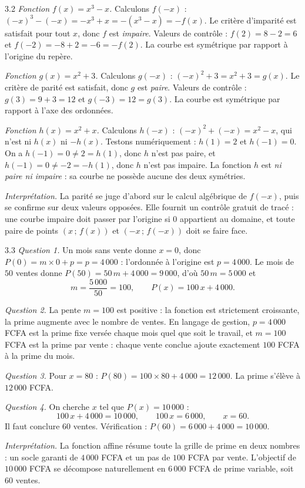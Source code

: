 \begin{corrige}{3.2}
\emph{Fonction $f(x) = x^{3} - x$.} Calculons $f(-x)$ : $(-x)^{3} - (-x) = -x^{3} + x = -(x^{3} - x) = -f(x)$. Le critère d'imparité est satisfait pour tout $x$, donc $f$ est \emph{impaire}. Valeurs de contrôle : $f(2) = 8 - 2 = 6$ et $f(-2) = -8 + 2 = -6 = -f(2)$. La courbe est symétrique par rapport à l'origine du repère.

\emph{Fonction $g(x) = x^{2} + 3$.} Calculons $g(-x)$ : $(-x)^{2} + 3 = x^{2} + 3 = g(x)$. Le critère de parité est satisfait, donc $g$ est \emph{paire}. Valeurs de contrôle : $g(3) = 9 + 3 = 12$ et $g(-3) = 12 = g(3)$. La courbe est symétrique par rapport à l'axe des ordonnées.

\emph{Fonction $h(x) = x^{2} + x$.} Calculons $h(-x)$ : $(-x)^{2} + (-x) = x^{2} - x$, qui n'est ni $h(x)$ ni $-h(x)$. Testons numériquement : $h(1) = 2$ et $h(-1) = 0$. On a $h(-1) = 0 \neq 2 = h(1)$, donc $h$ n'est pas paire, et $h(-1) = 0 \neq -2 = -h(1)$, donc $h$ n'est pas impaire. La fonction $h$ est \emph{ni paire ni impaire} : sa courbe ne possède aucune des deux symétries.

\emph{Interprétation.} La parité se juge d'abord sur le calcul algébrique de $f(-x)$, puis se confirme sur deux valeurs opposées. Elle fournit un contrôle gratuit de tracé : une courbe impaire doit passer par l'origine si $0$ appartient au domaine, et toute paire de points $(x\,;\,f(x))$ et $(-x\,;\,f(-x))$ doit se faire face.
\end{corrige}

\begin{corrige}{3.3}
\emph{Question 1.} Un mois sans vente donne $x = 0$, donc $P(0) = m \times 0 + p = p = 4\,000$ : l'ordonnée à l'origine est $p = 4\,000$. Le mois de $50$ ventes donne $P(50) = 50\,m + 4\,000 = 9\,000$, d'où $50\,m = 5\,000$ et
\[
m = \frac{5\,000}{50} = 100, \qquad P(x) = 100\,x + 4\,000.
\]

\emph{Question 2.} La pente $m = 100$ est positive : la fonction est strictement croissante, la prime augmente avec le nombre de ventes. En langage de gestion, $p = 4\,000$ FCFA est la prime fixe versée chaque mois quel que soit le travail, et $m = 100$ FCFA est la prime par vente : chaque vente conclue ajoute exactement $100$ FCFA à la prime du mois.

\emph{Question 3.} Pour $x = 80$ : $P(80) = 100 \times 80 + 4\,000 = 12\,000$. La prime s'élève à $12\,000$ FCFA.

\emph{Question 4.} On cherche $x$ tel que $P(x) = 10\,000$ :
\[
100\,x + 4\,000 = 10\,000, \qquad 100\,x = 6\,000, \qquad x = 60.
\]
Il faut conclure $60$ ventes. Vérification : $P(60) = 6\,000 + 4\,000 = 10\,000$.

\emph{Interprétation.} La fonction affine résume toute la grille de prime en deux nombres : un socle garanti de $4\,000$ FCFA et un pas de $100$ FCFA par vente. L'objectif de $10\,000$ FCFA se décompose naturellement en $6\,000$ FCFA de prime variable, soit $60$ ventes.
\end{corrige}


